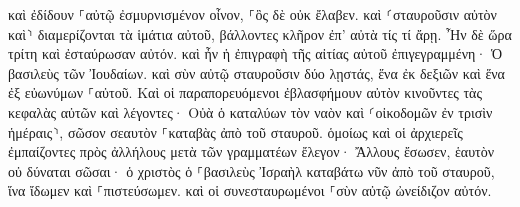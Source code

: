 \documentclass{openreader}
\begin{document}
καὶ ἐδίδουν ⸀αὐτῷ ἐσμυρνισμένον οἶνον, ⸀ὃς δὲ οὐκ ἔλαβεν. 
καὶ ⸂σταυροῦσιν αὐτὸν καὶ⸃ διαμερίζονται τὰ ἱμάτια αὐτοῦ, βάλλοντες κλῆρον ἐπ’ αὐτὰ τίς τί ἄρῃ. 
Ἦν δὲ ὥρα τρίτη καὶ ἐσταύρωσαν αὐτόν. 
καὶ ἦν ἡ ἐπιγραφὴ τῆς αἰτίας αὐτοῦ ἐπιγεγραμμένη· Ὁ βασιλεὺς τῶν Ἰουδαίων. 
καὶ σὺν αὐτῷ σταυροῦσιν δύο λῃστάς, ἕνα ἐκ δεξιῶν καὶ ἕνα ἐξ εὐωνύμων ⸀αὐτοῦ. 
Καὶ οἱ παραπορευόμενοι ἐβλασφήμουν αὐτὸν κινοῦντες τὰς κεφαλὰς αὐτῶν καὶ λέγοντες· Οὐὰ ὁ καταλύων τὸν ναὸν καὶ ⸂οἰκοδομῶν ἐν τρισὶν ἡμέραις⸃, 
σῶσον σεαυτὸν ⸀καταβὰς ἀπὸ τοῦ σταυροῦ. 
ὁμοίως καὶ οἱ ἀρχιερεῖς ἐμπαίζοντες πρὸς ἀλλήλους μετὰ τῶν γραμματέων ἔλεγον· Ἄλλους ἔσωσεν, ἑαυτὸν οὐ δύναται σῶσαι· 
ὁ χριστὸς ὁ ⸀βασιλεὺς Ἰσραὴλ καταβάτω νῦν ἀπὸ τοῦ σταυροῦ, ἵνα ἴδωμεν καὶ ⸀πιστεύσωμεν. καὶ οἱ συνεσταυρωμένοι ⸀σὺν αὐτῷ ὠνείδιζον αὐτόν. 
\end{document}
